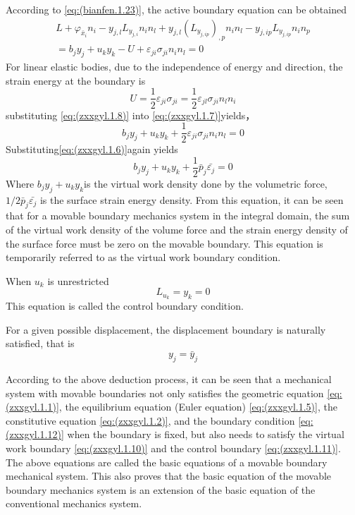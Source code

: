 According to \ref{eq:(bianfen.1.23)}, the active boundary equation can be obtained
\begin{multline} \label{eq:(zxxgyl.1.7)}    
L+ \varphi_{\bar {x}_i } n_i 
-y_{j,l} L_{y_{j,i}} n_i n_l   + y_{j,l} \left(L_{y_{j,ip}}\right)_{,p} n_i n_l 
-y_{j,ip} L_{y_{j,ip}} n_i  n_p 
\\=b_j y_j+u_k y_k-U+\varepsilon_{ji} \sigma_{ji} n_i n_l 
=0
\end{multline}
For linear elastic bodies, due to the independence of energy and direction, the strain energy at the boundary is
\begin{equation} \label{eq:(zxxgyl.1.8)}    
U=\frac{1}{2} \varepsilon_{ji} \sigma_{ji}=\frac{1}{2} \varepsilon_{jl} \sigma_{ji}n_l n_i
\end{equation}
substituting \ref{eq:(zxxgyl.1.8)} into \ref{eq:(zxxgyl.1.7)}yields，
\begin{equation} \label{eq:(zxxgyl.1.9)}    
b_j y_j+u_k y_k+\frac{1}{2} \varepsilon_{ji} \sigma_{ji} n_i n_l =0
\end{equation}
Substituting\ref{eq:(zxxgyl.1.6)}again yields
\begin{equation} \label{eq:(zxxgyl.1.10)}    
b_j y_j+u_k y_k+\frac{1}{2} \bar {p}_j \bar{\varepsilon_j} =0
\end{equation}
Where $b_j y_j+u_k y_k $is the virtual work density done by the volumetric force, $1/2 \bar {p}_j \bar{\varepsilon_j} $ is the surface strain energy density. From this equation, it can be seen that for a movable boundary mechanics system in the integral domain, the sum of the virtual work density of the volume force and the strain energy density of the surface force must be zero on the movable boundary. This equation is temporarily referred to as the virtual work boundary condition.

When $ u_k $ is unrestricted
\begin{equation} \label{eq:(zxxgyl.1.11)}    
L_{u_k} =y_k=0
\end{equation}
This equation is called the control boundary condition.

For a given possible displacement, the displacement boundary is naturally satisfied, that is
\begin{equation} \label{eq:(zxxgyl.1.12)}    
y_j=\bar{y}_j
\end{equation}

According to the above deduction process, it can be seen that a mechanical system with movable boundaries not only satisfies the geometric equation \ref{eq:(zxxgyl.1.1)}, the equilibrium equation (Euler equation) \ref{eq:(zxxgyl.1.5)}, the constitutive equation \ref{eq:(zxxgyl.1.2)}, and the boundary condition \ref{eq:(zxxgyl.1.12)} when the boundary is fixed, but also needs to satisfy the virtual work boundary \ref{eq:(zxxgyl.1.10)} and the control boundary \ref{eq:(zxxgyl.1.11)}. The above equations are called the basic equations of a movable boundary mechanical system. This also proves that the basic equation of the movable boundary mechanics system is an extension of the basic equation of the conventional mechanics system.

